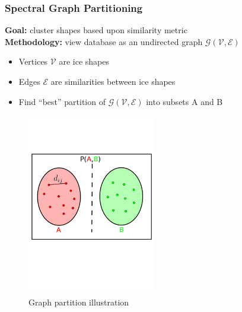 \documentclass[9pt]{beamer}
\begin{document}
\begin{frame}
\frametitle{Spectral Graph Partitioning}
\label{sec-3-4}

\textbf{Goal:} cluster shapes based upon similarity metric \\
\textbf{Methodology:} view database as an undirected graph
$\mathcal{G}(\mathcal{V},\mathcal{E})$
\begin{itemize}
\item Vertices $\mathcal{V}$ are ice shapes
\item Edges $\mathcal{E}$ are similarities between ice shapes
\item Find ``best'' partition of $\mathcal{G}(\mathcal{V},\mathcal{E})$ into subsets A and B
\end{itemize}
\vspace*{-1.25cm}
\begin{figure}
   \includegraphics[width=0.5\textwidth]{GraphPartition.png}
   \vspace{-2.25cm}
   \caption{Graph partition illustration} 
\end{figure}
\end{frame}
\end{document}
